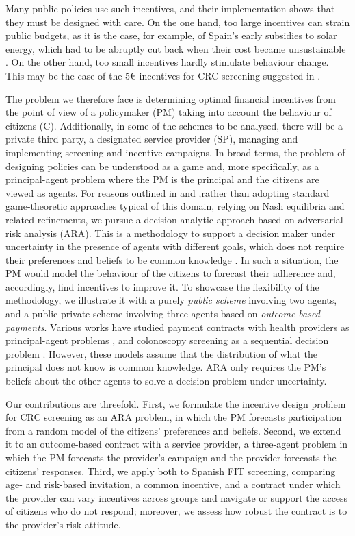 \documentclass[12pt]{article}
\begin{document}
Many public policies use such incentives, and their implementation shows that they must be designed with care. On the one hand, too large incentives can strain public budgets, as it is the case, for example, of Spain's early subsidies to solar energy, which had to be abruptly cut back when their cost became unsustainable \citep{del2012support}. On the other hand, too small incentives hardly stimulate behaviour change. This may be the case of the 5€ incentives for CRC screening suggested in \cite{facciorusso2021addition}.

The problem we therefore face is determining optimal financial incentives from the point of view of a policymaker (PM) taking into account the behaviour of citizens (C). Additionally, in some of the schemes to be analysed, there will be a private third party, a designated service provider (SP), managing and implementing screening and incentive campaigns. In broad terms, the problem of designing policies can be understood as a game and, more specifically, as a principal-agent problem \citep{smith1997principal} where the PM is the principal and the citizens are viewed as agents. For reasons outlined in \cite{rios2009adversarial} and \cite{banks2015adversarial},rather than adopting standard game-theoretic approaches typical of this domain, relying on Nash equilibria and related refinements, we pursue a decision analytic approach based on adversarial risk analysis (ARA). This is a methodology to support a decision maker under uncertainty in the presence of agents with different goals, which does not require their preferences and beliefs to be common knowledge \citep{raiffa2007negotiation}. In such a situation, the PM would model the behaviour of the citizens to forecast their adherence and, accordingly, find incentives to improve it. To showcase the flexibility of the methodology, we illustrate it with a purely {\em public scheme} involving two agents, and a public-private scheme involving three agents based on {\em outcome-based payments}. Various works have studied payment contracts with health providers as principal-agent problems \citep{fuloria2001outcomes, jiang2012performance, adida2017bundled}, and colonoscopy screening as a sequential decision problem \citep{erenay2014optimizing}. However, these models assume that the distribution of what the principal does not know is common knowledge. ARA only requires the PM's beliefs about the other agents to solve a decision problem under uncertainty.

Our contributions are threefold. First, we formulate the incentive design problem for CRC screening as an ARA problem, in which the PM forecasts participation from a random model of the citizens' preferences and beliefs. Second, we extend it to an outcome-based contract with a service provider, a three-agent problem in which the PM forecasts the provider's campaign and the provider forecasts the citizens' responses. Third, we apply both to Spanish FIT screening, comparing age- and risk-based invitation, a common incentive, and a contract under which the provider can vary incentives across groups and navigate or support the access of citizens who do not respond; moreover, we assess how robust the contract is to the provider's risk attitude.
\end{document}
